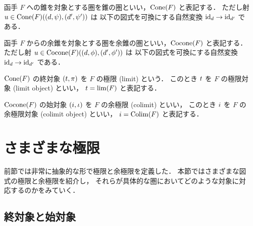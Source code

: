 \documentclass[titlepage]{ltjsreport}
\begin{document}
\begin{definition}[錐の圏]
  函手 $F$ への錐を対象とする圏を錐の圏といい，$\operatorname{Cone}(F)$ と表記する．
  ただし射 $u\in\mrps{\cone(F)}{(\obj{d},\psi)}{(\obj{d'},\psi')}$ は
  以下の図式を可換にする自然変換 $\id{\obj{d}}\to\id{\obj{d'}}$ である．
  \begin{center}
    
  \end{center}
\end{definition}

\begin{definition}[余錐の圏]
  函手 $F$ からの余錐を対象とする圏を余錐の圏といい，$\operatorname{Cocone}(F)$ と表記する．
  ただし射 $u\in\operatorname{Cocone}(F)((d,\phi),(d',\phi'))$ は
  以下の図式を可換にする自然変換 $\mathrm{id}_{d}\to\mathrm{id}_{d'}$ である．
  \begin{center}
    
  \end{center}
\end{definition}

\begin{definition}[極限]
  $\operatorname{Cone}(F)$ の終対象 $(\obj{t},\pi)$ を $F$ の極限 (limit) という．
  このとき $\obj{t}$ を $F$ の極限対象 (limit object) といい，
  $\obj{t}=\lim(F)$ と表記する．
\end{definition}

\begin{definition}[余極限]
  $\operatorname{Cocone}(F)$ の始対象 $(\obj{i},\iota)$ を $F$ の余極限 (colimit) といい，
  このとき $\obj{i}$ を $F$ の余極限対象 (colimit object) といい，
  $\obj{i}=\colim(F)$ と表記する．
\end{definition}

\section{さまざまな極限}

前節では非常に抽象的な形で極限と余極限を定義した．
本節ではさまざまな図式の極限と余極限を紹介し，
それらが具体的な圏においてどのような対象に対応するのかをみていく．

\subsection{終対象と始対象}
\end{document}
